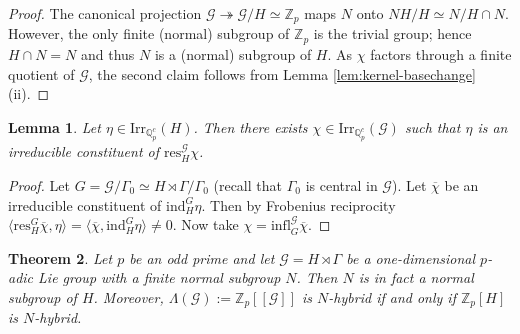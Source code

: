 \documentclass[12pt]{amsart}
\theoremstyle{plain}
\newtheorem{theorem}{Theorem}[section]
\newtheorem{lemma}[theorem]{Lemma}
\theoremstyle{remark}
\theoremstyle{definition}
\numberwithin{equation}{section}
\begin{document}
\begin{proof}
The canonical projection $\mathcal{G} \twoheadrightarrow \mathcal{G} / H \simeq \mathbb Z_{p}$ maps $N$ onto $NH /H \simeq N / H\cap N$.
However, the only finite (normal) subgroup of $\mathbb{Z}_{p}$ is the trivial group;
hence $H \cap N = N$ and thus $N$ is a (normal) subgroup of $H$.
As $\chi$ factors through a finite quotient of $\mathcal{G}$, the second claim follows from
Lemma \ref{lem:kernel-basechange} (ii).
\end{proof}

\begin{lemma}\label{lem:exists-chi-irr-constit-eta}
Let $\eta \in {\mathrm{Irr}}_{{\mathbb{Q}}_{p}^{c}}(H)$. Then there exists $\chi \in {\mathrm{Irr}}_{{\mathbb{Q}}_{p}^{c}}(\mathcal{G})$ such that $\eta$ is an irreducible constituent of
${\mathrm{res}}^{\mathcal{G}}_{H} \chi$.
\end{lemma}

\begin{proof}
Let $G=\mathcal{G}/\Gamma_{0} \simeq H \rtimes \Gamma/\Gamma_{0}$ (recall that $\Gamma_{0}$ is central in $\mathcal{G}$).
Let $\overline{\chi}$ be an irreducible constituent of ${\mathrm{ind}}^{G}_{H} \eta$.
Then by Frobenius reciprocity $\langle {\mathrm{res}}^{G}_{H} \overline{\chi}, \eta \rangle = \langle \overline{\chi}, {\mathrm{ind}}_{H}^{G} \eta \rangle \neq 0$.
Now take $\chi = {\mathrm{infl}}^{\mathcal{G}}_{G} \overline{\chi}$.
\end{proof}

\begin{theorem}\label{thm:hybrid-criterion}
Let $p$ be an odd prime and let $\mathcal{G} = H \rtimes \Gamma$ be a one-dimensional $p$-adic Lie group
with a finite normal subgroup $N$.
Then $N$ is in fact a normal subgroup of $H$.
Moreover, $\Lambda(\mathcal{G}):={\mathbb{Z}}_{p}[[\mathcal{G}]]$ is $N$-hybrid if and only if ${\mathbb{Z}}_{p}[H]$ is $N$-hybrid.
\end{theorem}
\end{document}
